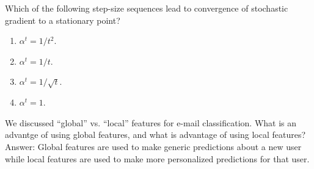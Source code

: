 \documentclass{article}
\def\gre#1{{\color{gre}#1}}
\def\ans#1{\gre{Answer: #1}}{}
\def\enum#1{\begin{enumerate}#1\end{enumerate}}
\begin{document}
{\item Which of the following step-size sequences lead to convergence of stochastic gradient to a stationary point?
\enum{
\item $\alpha^t = 1/t^2$.
\item $\alpha^t = 1/t$.
\item $\alpha^t = 1/\sqrt{t}$.
\item $\alpha^t = 1$.
}
\item We discussed ``global'' vs. ``local'' features for e-mail classification. What is an advantge of using global features, and what is advantage of using local features?
\ans{Global features are used to make generic predictions about a new user while local features are used to make more personalized predictions for that user.}}
\end{document}
